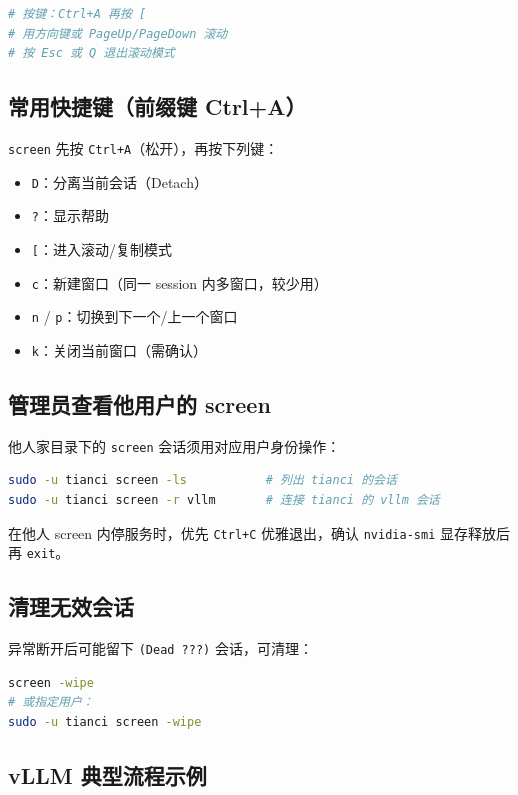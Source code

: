 \begin{lstlisting}[language=sh]
# 按键：Ctrl+A 再按 [
# 用方向键或 PageUp/PageDown 滚动
# 按 Esc 或 Q 退出滚动模式
\end{lstlisting}

\subsection{常用快捷键（前缀键 Ctrl+A）}

\texttt{screen} 先按 \texttt{Ctrl+A}（松开），再按下列键：

\begin{itemize}
    \item \texttt{D}：分离当前会话（Detach）
    \item \texttt{?}：显示帮助
    \item \texttt{[}：进入滚动/复制模式
    \item \texttt{c}：新建窗口（同一 session 内多窗口，较少用）
    \item \texttt{n} / \texttt{p}：切换到下一个/上一个窗口
    \item \texttt{k}：关闭当前窗口（需确认）
\end{itemize}

\subsection{管理员查看他用户的 screen}

他人家目录下的 \texttt{screen} 会话须用对应用户身份操作：

\begin{lstlisting}[language=sh]
sudo -u tianci screen -ls           # 列出 tianci 的会话
sudo -u tianci screen -r vllm       # 连接 tianci 的 vllm 会话
\end{lstlisting}

在他人 screen 内停服务时，优先 \texttt{Ctrl+C} 优雅退出，确认 \texttt{nvidia-smi} 显存释放后再 \texttt{exit}。

\subsection{清理无效会话}

异常断开后可能留下 \texttt{(Dead ???)} 会话，可清理：

\begin{lstlisting}[language=sh]
screen -wipe
# 或指定用户：
sudo -u tianci screen -wipe
\end{lstlisting}

\subsection{vLLM 典型流程示例}

